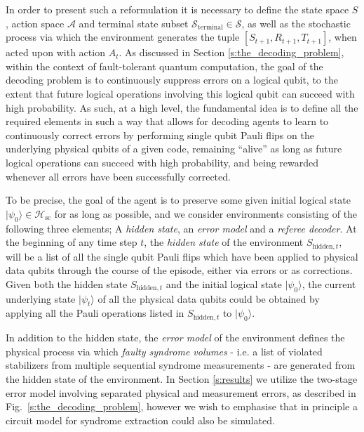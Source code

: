 \documentclass[twocolumn,preprintnumbers,amsmath,amssymb,notitlepage,nofootinbib,longbibliography,superscriptaddress,aps,pra,10pt]{revtex4-1}
\begin{document}
	In order to present such a reformulation it is necessary to define the state space $S$, action space $\mathcal{A}$ and terminal state subset $\mathcal{S}_\mathrm{terminal} \in \mathcal{S}$, as well as the stochastic process via which the environment generates the tuple $[S_{t+1},R_{t+1},T_{t+1}]$,  when acted upon with action $A_t$.
	As discussed in Section \ref{s:the_decoding_problem}, within the context of fault-tolerant quantum computation, the goal of the decoding problem is to continuously suppress errors on a logical qubit, to the extent that future logical operations involving this logical qubit can succeed with high probability.
	As such, at a high level, the fundamental idea is to define all the required elements in such a way that allows for decoding agents to learn to continuously correct errors by performing single qubit Pauli flips on the underlying physical qubits of a given code, remaining ``alive'' as long as future logical operations can succeed with high probability, and being rewarded whenever all errors have been successfully corrected.

	To be precise, the goal of the agent is to preserve some given initial logical state $|\psi_0\rangle \in \mathcal{H}_{\mathrm{sc}}$ for as long as possible, and we consider environments consisting of the following three elements; A \emph{hidden state}, an \emph{error model} and a \emph{referee decoder}.
	At the beginning of any time step $t$, the \emph{hidden state} of the environment $S_{\mathrm{hidden},t}$, will be a list of all the single qubit Pauli flips which have been applied to physical data qubits through the course of the episode, either via errors or as corrections.
	Given both the hidden state $S_{\mathrm{hidden},t}$ and the initial logical state $|\psi_0\rangle$, the current underlying state $|\psi_t\rangle$ of all the physical data qubits could be obtained by applying all the Pauli operations listed in $S_{\mathrm{hidden},t}$ to $|\psi_0\rangle$.

	In addition to the hidden state, the \emph{error model} of the environment defines the physical process via which \emph{faulty syndrome volumes} - i.e. a list of violated stabilizers from multiple sequential syndrome measurements - are generated from the hidden state of the environment.
	In Section \ref{s:results} we utilize the two-stage error model involving separated physical and measurement errors, as described in Fig.~\ref{s:the_decoding_problem}, however we wish to emphasise that in principle a circuit model for syndrome extraction could also be simulated.
\end{document}

